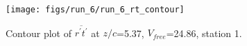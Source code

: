 \begin{figure}[H]
\centering
\texttt{[image: figs/run\_6/run\_6\_rt\_contour]}
\caption{Contour plot of $\overline{r^\prime t^\prime}$ at $z/c$=5.37, $V_{free}$=24.86, station 1.}
\label{fig:run_6_rt_contour}
\end{figure}


